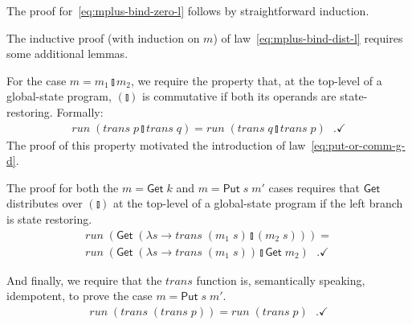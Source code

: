 \documentclass{llncs}
\newcommand{\Conid}[1]{\mathit{#1}}
\newcommand{\Varid}[1]{\mathit{#1}}
\let\Varid\mathit
\let\Conid\mathsf
\begin{document}
The proof for~\eqref{eq:mplus-bind-zero-l} follows by straightforward induction.

The inductive proof (with induction on \ensuremath{\Varid{m}}) of law~\eqref{eq:mplus-bind-dist-l}
requires some additional lemmas.

For the case \ensuremath{\Varid{m}\mathrel{=}\Varid{m}_{1}\mathbin{\talloblong}\Varid{m}_{2}}, we require the property that, at the top-level
of a global-state program, \ensuremath{(\talloblong)} is commutative if both its operands are
state-restoring.
Formally:
\begin{align}
  \ensuremath{\Varid{run}\;(\Varid{trans}\;\Varid{p}\mathbin{\talloblong}\Varid{trans}\;\Varid{q})} = \ensuremath{\Varid{run}\;(\Varid{trans}\;\Varid{q}\mathbin{\talloblong}\Varid{trans}\;\Varid{p})}\mbox{~~.} \checkmark
\end{align}
The proof of this property motivated the introduction of
law~\eqref{eq:put-or-comm-g-d}.

The proof for both the \ensuremath{\Varid{m}\mathrel{=}\Conid{Get}\;\Varid{k}} and \ensuremath{\Varid{m}\mathrel{=}\Conid{Put}\;\Varid{s}\;\Varid{m'}} cases requires that \ensuremath{\Conid{Get}}
distributes
over \ensuremath{(\talloblong)} at the top-level of a global-state program if the left branch is
state restoring.
\begin{align}
\ensuremath{\Varid{run}\;(\Conid{Get}\;(\lambda \Varid{s}\to \Varid{trans}\;(\Varid{m}_{1}\;\Varid{s})\mathbin{\talloblong}(\Varid{m}_{2}\;\Varid{s})))} = \\
\ensuremath{\Varid{run}\;(\Conid{Get}\;(\lambda \Varid{s}\to \Varid{trans}\;(\Varid{m}_{1}\;\Varid{s}))\mathbin{\talloblong}\Conid{Get}\;\Varid{m}_{2})} \label{eq:get-ret-mplus-g}\mbox{~~.} \checkmark
\end{align}

And finally, we require that the \ensuremath{\Varid{trans}} function is, semantically speaking,
idempotent, to prove the case \ensuremath{\Varid{m}\mathrel{=}\Conid{Put}\;\Varid{s}\;\Varid{m'}}.
\begin{align}
\ensuremath{\Varid{run}\;(\Varid{trans}\;(\Varid{trans}\;\Varid{p}))\mathrel{=}\Varid{run}\;(\Varid{trans}\;\Varid{p})} \label{eq:run-trans-trans} \mbox{~~.} \checkmark
\end{align}

\noindent
\end{document}
